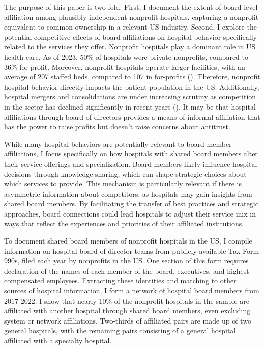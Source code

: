 \documentclass[12pt]{article}
\begin{document}
    The purpose of this paper is two-fold. First, I document the extent of board-level affiliation among plausibly independent nonprofit hospitals, capturing a nonprofit equivalent to common ownership in a relevant US industry. Second, I explore the potential competitive effects of board affiliations on hospital behavior specifically related to the services they offer. Nonprofit hospitals play a dominant role in US health care. As of 2023, 50\% of hospitals were private nonprofits, compared to 36\% for-profit. Moreover, nonprofit hospitals operate larger facilities, with an average of 207 staffed beds, compared to 107 in for-profits (\cite{ASPE_2023}). Therefore, nonprofit hospital behavior directly impacts the patient population in the US. Additionally, hospital mergers and consolidations are under increasing scrutiny as competition in the sector has declined significantly in recent years (\cite{levinson2024ten}). It may be that hospital affiliations through board of directors provides a means of informal affiliation that has the power to raise profits but doesn't raise concerns about antitrust. 

    While many hospital behaviors are potentially relevant to board member affiliations, I focus specifically on how hospitals with shared board members alter their service offerings and specialization. Board members likely influence hospital decisions through knowledge sharing, which can shape strategic choices about which services to provide. This mechanism is particularly relevant if there is asymmetric information about competitors, as hospitals may gain insights from shared board members. By facilitating the transfer of best practices and strategic approaches, board connections could lead hospitals to adjust their service mix in ways that reflect the experiences and priorities of their affiliated institutions. 

    To document shared board members of nonprofit hospitals in the US, I compile information on hospital board of director teams from publicly available Tax Form 990s, filed each year by nonprofits in the US. One section of this form requires declaration of the names of each member of the board, executives, and highest compensated employees. Extracting these identities and matching to other sources of hospital information, I form a network of hospital board members from 2017-2022. I show that nearly 10\% of the nonprofit hospitals in the sample are affiliated with another hospital through shared board members, even excluding system or network affiliations. Two-thirds of affiliated pairs are made up of two general hospitals, with the remaining pairs consisting of a general hospital affiliated with a specialty hospital. 
\end{document}
